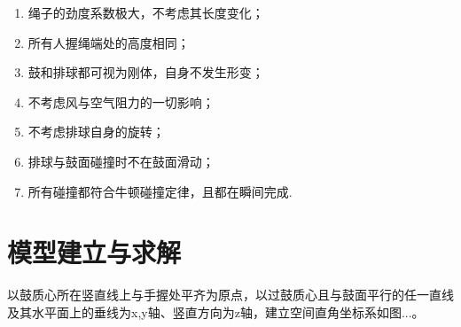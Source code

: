 \documentclass{cumcmthesis}
\begin{document}
\begin{enumerate}
	\item 绳子的劲度系数极大，不考虑其长度变化；
	\item 所有人握绳端处的高度相同；
	\item 鼓和排球都可视为刚体，自身不发生形变；
	\item 不考虑风与空气阻力的一切影响；
	\item 不考虑排球自身的旋转；
	\item 排球与鼓面碰撞时不在鼓面滑动；
	\item 所有碰撞都符合牛顿碰撞定律，且都在瞬间完成.
%
\end{enumerate}

\section{模型建立与求解}
以鼓质心所在竖直线上与手握处平齐为原点，以过鼓质心且与鼓面平行的任一直线及其水平面上的垂线为x,y轴、竖直方向为z轴，建立空间直角坐标系如图...。
\end{document}
